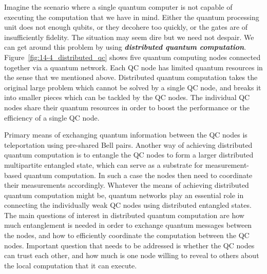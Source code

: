 Imagine the scenario where a single quantum computer is not capable of executing the computation that we have in mind.
Either the quantum processing unit does not enough qubits, or they decohere too quickly, or the gates are of insufficiently fidelity.
The situation may seem dire but we need not despair.
We can get around this problem by using \textbf{\textit{distributed quantum computation}}.
Figure~\ref{fig:14-4_distributed_qc} shows five quantum computing nodes connected together via a quantum network.
Each QC node has limited quantum resources in the sense that we mentioned above.
Distributed quantum computation takes the original large problem which cannot be solved by a single QC node, and breaks it into smaller pieces which can be tackled by the QC nodes.
The individual QC nodes share their quantum resources in order to boost the performance or the efficiency of a single QC node.

Primary means of exchanging quantum information between the QC nodes is teleportation using pre-shared Bell pairs.
Another way of achieving distributed quantum computation is to entangle the QC nodes to form a larger distributed multipartite entangled state, which can serve as a substrate for measurement-based quantum computation.
In such a case the nodes then need to coordinate their measurements accordingly.
Whatever the means of achieving distributed quantum computation might be, quantum networks play an essential role in connecting the individually weak QC nodes using distributed entangled states.
The main questions of interest in distributed quantum computation are how much entanglement is needed in order to exchange quantum messages between the nodes, and how to efficiently coordinate the computation between the QC nodes.
Important question that needs to be addressed is whether the QC nodes can trust each other, and how much is one node willing to reveal to others about the local computation that it can execute.

